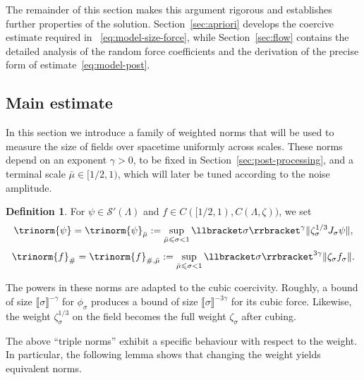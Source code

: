 \documentclass{article}
\numberwithin{equation}{section}
\newcommand{\assign}{:=}
\theoremstyle{plain}
\theoremstyle{definition}
\newtheorem{definition}[theorem]{Definition}
\begin{document}
The remainder of this section makes this argument rigorous and establishes
further properties of the solution. Section~\ref{sec:apriori} develops the
coercive estimate required in ~\eqref{eq:model-size-force}, while
Section~\ref{sec:flow} contains the detailed analysis of the random force
coefficients and the derivation of the precise form of
estimate~\eqref{eq:model-post}.

\subsection{Main estimate}

In this section we introduce a family of weighted norms that will be used to
measure the size of fields over spacetime uniformly across scales. These norms
depend on an exponent $\gamma > 0$, to be fixed in
Section~\ref{sec:post-processing}, and a terminal scale $\bar{\mu} \in [1 / 2,
1)$, which will later be tuned according to the noise amplitude.

\begin{definition}
  \label{def:triple-norms}For $\psi \in \mathcal{S}' (\Lambda)$ and $f \in C
  ([1 / 2, 1), C (\Lambda, \zeta))$, we set
  \begin{equation}
    \trinorm{ \psi } = \trinorm{ \psi }_{\bar{\mu}}
    \assign \sup_{\bar{\mu} \leqslant \sigma < 1} \llbracket \sigma
    \rrbracket^{\gamma}  \| \zeta^{1 / 3}_{\sigma} J_{\sigma} \psi \|,
    \label{eq:sol-norm}
  \end{equation}
  \begin{equation}
    \trinorm{ f }_{\#} = \trinorm{ f }_{\#, \bar{\mu}}
    \assign \sup_{\bar{\mu} \leqslant \sigma < 1}  \llbracket \sigma \rrbracket^{3
    \gamma}  \| \zeta_{\sigma} f_{\sigma} \| . \label{eq:sharp-norm}
  \end{equation}
\end{definition}

The powers in these norms are adapted to the cubic coercivity. Roughly, a
bound of size $\llbracket\sigma\rrbracket^{-\gamma}$ for $\phi_{\sigma}$
produces a bound of size $\llbracket\sigma\rrbracket^{-3\gamma}$ for its
cubic force. Likewise, the weight $\zeta_{\sigma}^{1/3}$ on the field becomes
the full weight $\zeta_{\sigma}$ after cubing.

The above ``triple norms'' exhibit a specific behaviour with respect to the
weight. In particular, the following lemma shows that changing the weight
yields equivalent norms.
\end{document}
